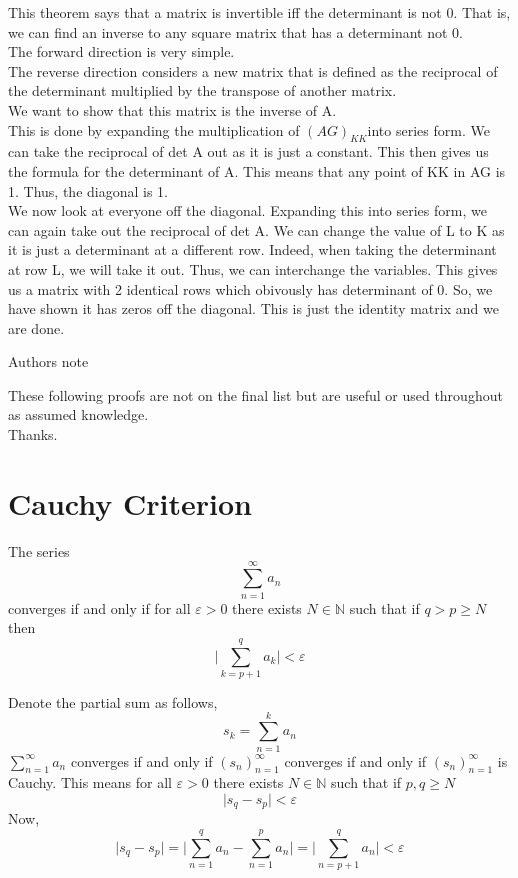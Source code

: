 \documentclass[12pt]{article}
\begin{document}
\newpage
\begin{explanation}{}
    This theorem says that a matrix is invertible iff the determinant is not 0. That is, we can find an inverse to any square matrix that has a determinant not 0.\\
The forward direction is very simple.\\
The reverse direction considers a new matrix that is defined as the reciprocal of the determinant multiplied by the transpose of another matrix.\\
We want to show that this matrix is the inverse of A.\\
This is done by expanding the multiplication of $(AG)_{KK} $into series form. We can take the reciprocal of det A out as it is just a constant. This then gives us the formula for the determinant of A. This means that any point of KK in AG is 1. Thus, the diagonal is 1.\\
We now look at everyone off the diagonal. Expanding this into series form, we can again take out the reciprocal of det A. We can change the value of L to K as it is just a determinant at a different row. Indeed, when taking the determinant at row L, we will take it out. Thus, we can interchange the variables. This gives us a matrix with 2 identical rows which obivously has determinant of 0. So, we have shown it has zeros off the diagonal. This is just the identity matrix and we are done.\\
\end{explanation}


\begin{center}
    \textmd{Authors note}
\end{center}
\vspace{10mm}
These following proofs are not on the final list but are useful or used throughout as assumed knowledge.\\
Thanks.
\newpage
    \section{Cauchy Criterion}
    \begin{theo}{}
        The series
        \[\displaystyle\sum^\infty_{n=1} a_n\]
        converges if and only if for all \(\varepsilon >0\) there exists \(N \in\mathbb{N}\) such that if \(q> p \geq N\) then
        \[\bigg\vert\displaystyle\sum^q_{k=p+1} a_k\bigg\vert < \varepsilon\]
    \end{theo}
    \begin{prf}
        Denote the partial sum as follows,
        \[s_k = \displaystyle\sum^k_{n=1} a_n\]
        \(\displaystyle\sum^\infty_{n=1} a_n\) converges if and only if \((s_n)^\infty_{n=1}\) converges if and only if \((s_n)^\infty_{n=1}\) is Cauchy. This means for all \(\varepsilon > 0\) there exists \(N \in \mathbb{N}\) such that if \(p,q \geq N\)
        \[\vert s_q - s_p\vert < \varepsilon\]
        Now,
        \[\vert s_q - s_p\vert = \bigg\vert\displaystyle\sum^q_{n=1} a_n - \sum^p_{n=1} a_n\bigg\vert = \bigg\vert\displaystyle\sum^q_{n=p+1} a_n\bigg\vert < \varepsilon\]
    \end{prf}
\end{document}
